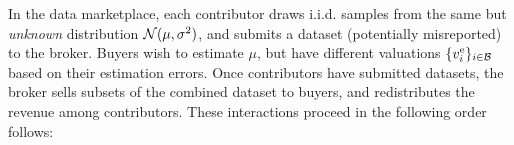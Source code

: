 In the data marketplace,
each contributor draws i.i.d. samples from the same but \emph{unknown} distribution $\mathcal{N}(\mu,\sigma^2)$, and submits a dataset (potentially misreported) to the broker.
Buyers wish to estimate $\mu$, but have different valuations $\{v^{\rm e}_{i}\}_{i\in\mathcal{B}}$ based on their estimation errors.
Once contributors have submitted datasets, the broker sells subsets of the combined dataset to buyers, and redistributes the revenue among contributors.
These interactions proceed in the following order follows:
